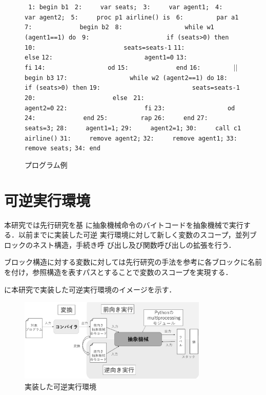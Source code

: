 \documentclass[submit,PRO]{ipsj}
\def\|{\verb|}
\begin{document}
\begin{figure}[tb]
\vbox{
\hbox{\| 1: begin b1|}
\hbox{\| 2:     var seats;|}
\hbox{\| 3:     var agent1;|}
\hbox{\| 4:     var agent2;|}
\hbox{\| 5:     proc p1 airline() is|}
\hbox{\| 6:         par a1 |}
\hbox{\| 7:             begin b2|}
\hbox{\| 8:                 while w1 (agent1==1) do|}
\hbox{\| 9:                     if (seats>0) then|}
\hbox{\|10:                        seats=seats-1|}
\hbox{\|11:                     else|}
\hbox{\|12:                         agent1=0|}
\hbox{\|13:                     fi|}
\hbox{\|14:                 od|}
\hbox{\|15:             end|}
\hbox{\|16:         |$||$\|  begin b3|}
\hbox{\|17:                 while w2 (agent2==1) do|}
\hbox{\|18:                     if (seats>0) then|}
\hbox{\|19:                         seats=seats-1|}
\hbox{\|20:                     else |}
\hbox{\|21:                         agent2=0|}
\hbox{\|22:                     fi|}
\hbox{\|23:                 od|}
\hbox{\|24:             end|}
\hbox{\|25:         rap|}
\hbox{\|26:     end|}
\hbox{\|27:     seats=3;|}
\hbox{\|28:     agent1=1;|}
\hbox{\|29:     agent2=1;|}
\hbox{\|30:     call c1 airline()|}
\hbox{\|31:     remove agent2;|}
\hbox{\|32:     remove agent1;|}
\hbox{\|33:     remove seats;|}
\hbox{\|34: end|}
}
\centerline{}
\caption{プログラム例}
\label{fig:sample}
\end{figure}



\section{可逆実行環境}
\label{config}

本研究では先行研究\cite{DBLP:journals/corr/abs-1808-08651,Hoey20PHD}を基
に抽象機械命令のバイトコードを抽象機械で実行する．以前までに実装した可逆
実行環境に対して新しく変数のスコープ，並列ブロックのネスト構造，手続き呼
び出し及び関数呼び出しの拡張を行う．

ブロック構造に対する変数に対しては先行研究の手法を参考に各ブロックに名前
を付け，参照構造を表すパスとすることで変数のスコープを実現する．

に本研究で実装した可逆実行環境のイメージを示す．

\begin{figure}[tb]
\includegraphics[height=4.0cm,width=9.0cm]{./abstract.eps}
\caption{実装した可逆実行環境}
\label{fig:abst}
\end{figure}
\end{document}
